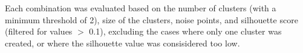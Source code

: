 Each combination was evaluated based on the number of clusters (with a minimum threshold of 2), size of the clusters, noise points, and silhouette score 
(filtered for values $>$ 0.1), excluding the cases where only one cluster was created, or where the silhouette value was consisidered too low.





